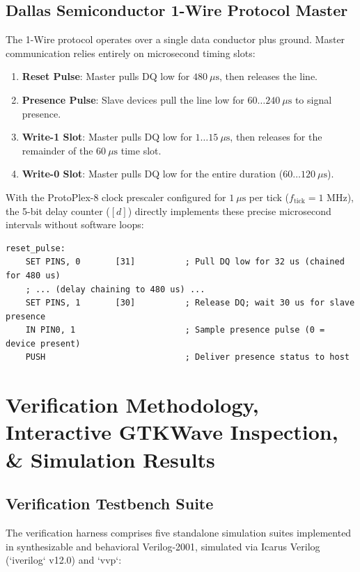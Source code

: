 \documentclass[11pt,a4paper]{article}
\begin{document}
\subsection{Dallas Semiconductor 1-Wire Protocol Master}
The 1-Wire protocol operates over a single data conductor plus ground. Master communication relies entirely on microsecond timing slots:
\begin{enumerate}
    \item \textbf{Reset Pulse}: Master pulls DQ low for $480\ \mu\text{s}$, then releases the line.
    \item \textbf{Presence Pulse}: Slave devices pull the line low for $60 \dots 240\ \mu\text{s}$ to signal presence.
    \item \textbf{Write-1 Slot}: Master pulls DQ low for $1 \dots 15\ \mu\text{s}$, then releases for the remainder of the $60\ \mu\text{s}$ time slot.
    \item \textbf{Write-0 Slot}: Master pulls DQ low for the entire duration ($60 \dots 120\ \mu\text{s}$).
\end{enumerate}

With the ProtoPlex-8 clock prescaler configured for $1\ \mu\text{s}$ per tick ($f_{\text{tick}} = 1\text{ MHz}$), the 5-bit delay counter ($[d]$) directly implements these precise microsecond intervals without software loops:
\begin{lstlisting}[language={[x86masm]Assembler}, caption={1-Wire Reset and Presence Detection Microcode}]
reset_pulse:
    SET PINS, 0       [31]          ; Pull DQ low for 32 us (chained for 480 us)
    ; ... (delay chaining to 480 us) ...
    SET PINS, 1       [30]          ; Release DQ; wait 30 us for slave presence
    IN PIN0, 1                      ; Sample presence pulse (0 = device present)
    PUSH                            ; Deliver presence status to host
\end{lstlisting}

\section{Verification Methodology, Interactive GTKWave Inspection, \& Simulation Results}

\subsection{Verification Testbench Suite}
The verification harness comprises five standalone simulation suites implemented in synthesizable and behavioral Verilog-2001, simulated via Icarus Verilog (`iverilog` v12.0) and `vvp`:
\end{document}
